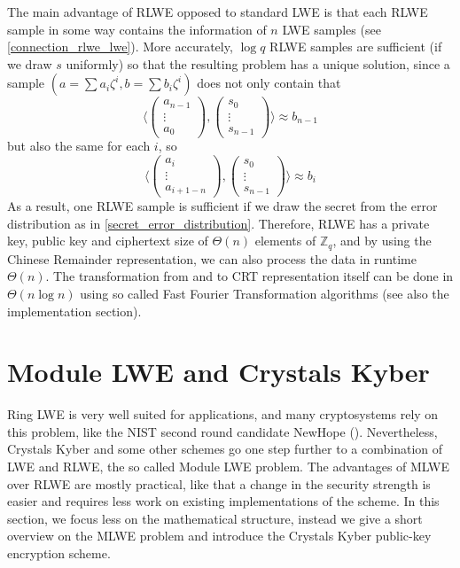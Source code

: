 \documentclass{report}
\newcommand{\Z}{\mathbb{Z}}
\begin{document}


The main advantage of RLWE opposed to standard LWE is that each RLWE sample in some way contains the information of $n$ LWE samples (see \ref{connection_rlwe_lwe}). More accurately, $\log q$ RLWE samples are sufficient (if we draw $s$ uniformly) so that the resulting problem has a unique solution, since a sample $(a = \sum a_i \zeta^i, b = \sum b_i \zeta^i)$ does not only contain that
\begin{equation}
\langle
\begin{pmatrix} a_{n - 1} \\ \vdots \\ a_0 \end{pmatrix}
,
\begin{pmatrix} s_0 \\ \vdots \\ s_{n - 1} \end{pmatrix}
\rangle \nonumber
\approx
b_{n - 1}
\end{equation}
but also the same for each $i$, so
\begin{equation}
\langle
\begin{pmatrix} a_i \\ \vdots \\ a_{i + 1 - n} \end{pmatrix}
,
\begin{pmatrix} s_0 \\ \vdots \\ s_{n - 1} \end{pmatrix}
\rangle
\approx
b_i \nonumber
\end{equation}
As a result, one RLWE sample is sufficient if we draw the secret from the error distribution as in \ref{secret_error_distribution}. Therefore, RLWE has a private key, public key and ciphertext size of $\Theta(n)$ elements of $\Z_q$, and by using the Chinese Remainder representation, we can also process the data in runtime $\Theta(n)$. The transformation from and to CRT representation itself can be done in $\Theta(n\log n)$ using so called Fast Fourier Transformation algorithms (see also the implementation section).


\chapter{Module LWE and Crystals Kyber}

\motivation
Ring LWE is very well suited for applications, and many cryptosystems rely on this problem, like the NIST second round candidate NewHope (\cite{NewHope}). Nevertheless, Crystals Kyber and some other schemes go one step further to a combination of LWE and RLWE, the so called Module LWE problem. The advantages of MLWE over RLWE are mostly practical, like that a change in the security strength is easier and requires less work on existing implementations of the scheme. In this section, we focus less on the mathematical structure, instead we give a short overview on the MLWE problem and introduce the Crystals Kyber public-key encryption scheme.
\end{document}
